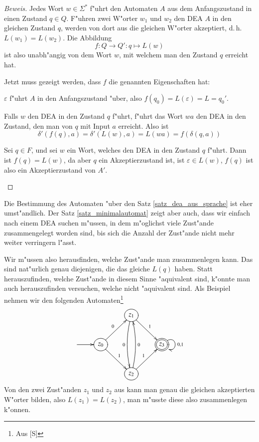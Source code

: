 \begin{proof}[Beweis]
Jedes Wort $w\in\Sigma^*$ f"uhrt den Automaten $A$ aus dem
Anfangszustand in einen Zustand $q\in Q$. F"uhren zwei W"orter
$w_1$ und $w_2$ den DEA $A$ in den gleichen Zustand $q$, werden
von dort aus die gleichen W"orter akzeptiert, d.\,h.~$L(w_1)=L(w_2)$.
Die Abbildung
\[
f\colon Q\to Q': q\mapsto L(w)
\]
ist also unabh"angig von dem Wort $w$, mit welchem man den Zustand $q$
erreicht hat. 

Jetzt muss gezeigt werden, dass $f$ die genannten Eigenschaften hat:
\begin{compactenum}
\item
$\varepsilon$ f"uhrt $A$ in den Anfangszustand "uber, also
$f(q_0)=L(\varepsilon)=L=q_0'$.
\item Falls $w$ den DEA in den Zustand $q$ f"uhrt, f"uhrt das Wort
$wa$ den DEA in den Zustand, den man von $q$ mit Input $a$ erreicht.
Also ist
\[
\delta'(f(q),a)=\delta'(L(w), a)=L(wa)=f(\delta(q,a))
\]
\item Sei $q\in F$, und sei $w$ ein Wort, welches den DEA in den Zustand 
$q$ f"uhrt. Dann ist $f(q)=L(w)$, da aber $q$ ein Akzeptierzustand ist,
ist $\varepsilon\in L(w)$, $f(q)$ ist also ein Akzeptierzustand von
$A'$.
\end{compactenum}

\end{proof}

Die Bestimmung des Automaten "uber den Satz \ref{satz_dea_aus_sprache}
ist eher umst"andlich. Der Satz \ref{satz_minimalautomat} zeigt
aber auch, dass wir einfach nach einem DEA suchen m"ussen, in dem
m"oglichst viele Zust"ande zusammengelegt worden sind, bis sich die
Anzahl der Zust"ande nicht mehr weiter verringern l"asst.

Wir m"ussen also herausfinden, welche Zust"ande man zusammenlegen
kann. Das sind nat"urlich genau diejenigen, die das gleiche $L(q)$
haben.
Statt herauszufinden, welche Zust"ande in diesem Sinne "aquivalent
sind, k"onnte man auch herauszufinden versuchen, welche nicht "aquivalent
sind. Als Beispiel nehmen wir den folgenden Automaten\footnote{Aus [S]}
\[
\entrymodifiers={++[o][F]}
\xymatrix{
*+\txt{}
	&*+\txt{}
		&{z_1}\ar@/_/[dd]_{0} \ar[dr]^{1}
\\
*+\txt{} \ar[r]
	&{z_0}\ar[ur]^{0} \ar[dr]^1
		&*+\txt{}
			&*++[o][F=]{z_3}\ar@(ur,dr)^{0,1}
\\
*+\txt{}
	&*+\txt{}
		&{z_2} \ar@/_/[uu]_{0} \ar[ur]^{1}
}
\]
Von den zwei Zust"anden $z_1$ und $z_2$ aus kann man genau die gleichen
akzeptierten W"orter bilden, also $L(z_1)=L(z_2)$, man m"usste diese
also zusammenlegen k"onnen.

